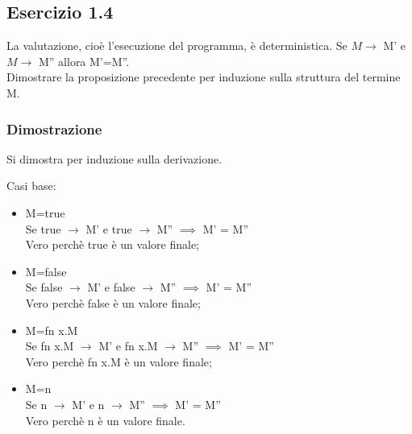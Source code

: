 \subsection*{Esercizio 1.4}
La valutazione, cio\`e l’esecuzione del programma, \`e deterministica. Se $M \rightarrow$ M' e
$M \rightarrow$ M'' allora M'=M''.\\
Dimostrare la proposizione precedente per induzione sulla struttura del termine M.

\subsubsection*{Dimostrazione}
Si dimostra per induzione sulla derivazione.

Casi base:
\begin{itemize}
	\item M=true \\
	\indent	Se true $\rightarrow$ M' e true $\rightarrow$ M'' $\implies$ M' = M''\\
	\indent Vero perchè true è un valore finale;
	
 \item M=false \\
	\indent	Se false $\rightarrow$ M' e false $\rightarrow$ M'' $\implies$ M' = M''\\
	\indent Vero perchè false è un valore finale;

\item M=fn x.M \\
	\indent	Se fn x.M $\rightarrow$ M' e fn x.M $\rightarrow$ M'' $\implies$ M' = M''\\
	\indent Vero perchè fn x.M è un valore finale;
	\item M=n \\
	\indent	Se n $\rightarrow$ M' e n $\rightarrow$ M'' $\implies$ M' = M''\\
	\indent Vero perchè n è un valore finale.
\end{itemize}
 
